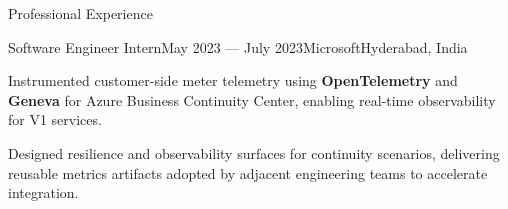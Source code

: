 \begin{rSection}{Professional Experience}
    \begin{rSubsection}{Software Engineer Intern}{May 2023 --- July 2023}{Microsoft}{Hyderabad, India}
        \item Instrumented customer-side meter telemetry using \textbf{OpenTelemetry} and \textbf{Geneva} for Azure Business Continuity Center, enabling real-time observability for V1 services.
        \item Designed resilience and observability surfaces for continuity scenarios, delivering reusable metrics artifacts adopted by adjacent engineering teams to accelerate integration.
    \end{rSubsection}

\end{rSection}